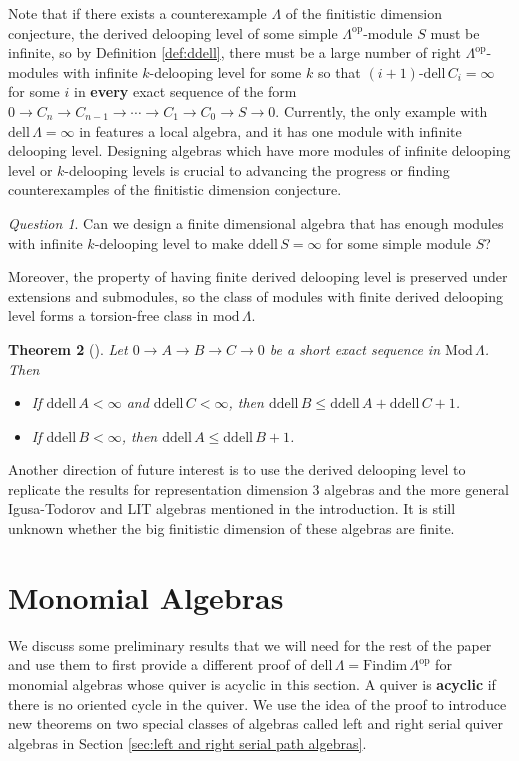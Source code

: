 \documentclass{conm-p-l}
\newcommand{\Findim}{\mathrm{Findim}\,}
\newcommand{\dell}{\mathrm{dell}\,}
\renewcommand{\dell}{\mathrm{dell}\,}
\newcommand{\op}{\mathrm{op}}
\renewcommand{\mod}{\mathrm{mod}\,}
\newcommand{\Mod}{\mathrm{Mod}\,}
\newcommand{\ddell}{\mathrm{ddell}\,}
\newtheorem{theorem}{Theorem}[section]
\theoremstyle{definition}
\theoremstyle{remark}
\newtheorem{question}[theorem]{Question}
\numberwithin{equation}{section}
\begin{document}
Note that if there exists a counterexample $\Lambda$ of the finitistic dimension conjecture, the derived delooping level of some simple $\Lambda^{\op}$-module $S$ must be infinite, so by Definition \ref{def:ddell}, there must be a large number of right $\Lambda^{\op}$-modules with infinite $k$-delooping level for some $k$ so that $(i+1)$-$\dell C_i=\infty$ for some $i$ in \textbf{every} exact sequence of the form $0\to C_n\to C_{n-1}\to\cdots\to C_1\to C_0\to S\to 0$. Currently, the only example with $\dell\Lambda=\infty$ in \cite{kershaw2023} features a local algebra, and it has one module with infinite delooping level. Designing algebras which have more modules of infinite delooping level or $k$-delooping levels is crucial to advancing the progress or finding counterexamples of the finitistic dimension conjecture.

\begin{question}
Can we design a finite dimensional algebra that has enough modules with infinite $k$-delooping level to make $\ddell S=\infty$ for some simple module $S$?
\end{question}

Moreover, the property of having finite derived delooping level is preserved under extensions and submodules, so the class of modules with finite derived delooping level forms a torsion-free class in $\mod\Lambda$.

\begin{theorem}[\cite{guo2025derived}]
Let $0\to A\to B\to C\to 0$ be a short exact sequence in $\Mod\Lambda$. Then
\begin{itemize}
\item If $\ddell A<\infty$ and $\ddell C<\infty$, then $\ddell B\leq\ddell A + \ddell C + 1$.
\item If $\ddell B<\infty$, then $\ddell A\leq \ddell B+1$.
\end{itemize}
\end{theorem}
Another direction of future interest is to use the derived delooping level to replicate the results for representation dimension 3 algebras and the more general Igusa-Todorov and LIT algebras mentioned in the introduction. It is still unknown whether the big finitistic dimension of these algebras are finite.

\section{Monomial Algebras}
\label{sec:Monomial algebras}

We discuss some preliminary results that we will need for the rest of the paper and use them to first provide a different proof of $\dell\Lambda=\Findim\Lambda^{\op}$ for monomial algebras whose quiver is acyclic in this section. A quiver is \textbf{acyclic} if there is no oriented cycle in the quiver. We use the idea of the proof to introduce new theorems on two special classes of algebras called left and right serial quiver algebras in Section \ref{sec:left and right serial path algebras}.
\end{document}
